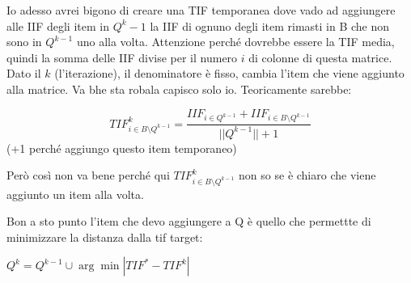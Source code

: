 \documentclass[]{scrreprt}
\begin{document}
Io adesso avrei bigono di creare una TIF temporanea dove vado ad aggiungere alle IIF degli item in $Q^k-1$ la IIF di ognuno degli item rimasti in B che non sono in $Q^{k-1}$ uno alla volta. Attenzione perché dovrebbe essere la TIF media, quindi la somma delle IIF divise per il numero $i$ di colonne di questa matrice. Dato il $k$ (l'iterazione), il denominatore è fisso, cambia l'item che viene aggiunto alla matrice. Va bhe sta robala capisco solo io. Teoricamente sarebbe: 

$$TIF_{i \in B\setminus Q^{k-1}}^k = \frac{IIF_{i \in Q^{k-1}} + IIF_{i \in B \setminus Q^{k-1}}}{||Q^{k-1}|| + 1}$$ (+1 perché aggiungo questo item temporaneo) 

Però così non va bene perché qui $TIF_{i \in B\setminus Q^{k-1}}^k$ non so se è chiaro che viene aggiunto un item alla volta. 

Bon a sto punto l'item che devo aggiungere a Q è quello che permettte di minimizzare la distanza dalla tif target: 

$Q^k = Q^{k-1} \cup \arg \min |TIF^* - TIF^k|$
\end{document}
